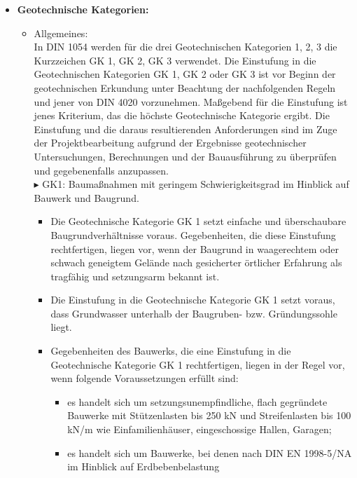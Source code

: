 \documentclass[fleqn,twoside]{article}
\begin{document}
\begin{itemize}
    \item \textbf{Geotechnische Kategorien:}
        \begin{itemize}
            \item Allgemeines:\\
                In DIN 1054 werden für die drei Geotechnischen Kategorien 1, 2, 3 die Kurzzeichen GK 1, GK 2, GK 3 verwendet.
                Die Einstufung in die Geotechnischen Kategorien GK 1, GK 2 oder GK 3 ist vor Beginn der geotechnischen Erkundung unter Beachtung der nachfolgenden Regeln und jener von DIN 4020 vorzunehmen. Maßgebend für die Einstufung ist jenes Kriterium, das die höchste Geotechnische Kategorie ergibt. Die Einstufung und die daraus resultierenden Anforderungen sind im Zuge der Projektbearbeitung aufgrund der Ergebnisse geotechnischer Untersuchungen, Berechnungen und der Bauausführung zu überprüfen und gegebenenfalls anzupassen.\vspace*{8pt}\\
                $\blacktriangleright$ GK1: Baumaßnahmen mit geringem Schwierigkeitsgrad im Hinblick auf Bauwerk und Baugrund.
                    \begin{itemize}
                    \item Die Geotechnische Kategorie GK 1 setzt einfache und überschaubare Baugrundverhältnisse voraus.
                        Gegebenheiten, die diese Einstufung rechtfertigen, liegen vor, wenn der Baugrund in waagerechtem oder
                        schwach geneigtem Gelände nach gesicherter örtlicher Erfahrung als tragfähig und setzungsarm bekannt ist.
                    \item Die Einstufung in die Geotechnische Kategorie GK 1 setzt voraus, dass Grundwasser unterhalb der
                        Baugruben- bzw. Gründungssohle liegt.
                    \item Gegebenheiten des Bauwerks, die eine Einstufung in die Geotechnische Kategorie GK 1 rechtfertigen, liegen in der Regel vor, wenn folgende Voraussetzungen erfüllt sind:
                        \begin{itemize}
                            \item es handelt sich um setzungsunempfindliche, flach gegründete Bauwerke mit Stützenlasten bis 250 kN
                            und Streifenlasten bis 100 kN/m wie Einfamilienhäuser, eingeschossige Hallen, Garagen;
                            \item es handelt sich um Bauwerke, bei denen nach DIN EN 1998-5/NA im Hinblick auf Erdbebenbelastung

\end{itemize}
\end{itemize}
\end{itemize}
\end{itemize}
\end{document}
